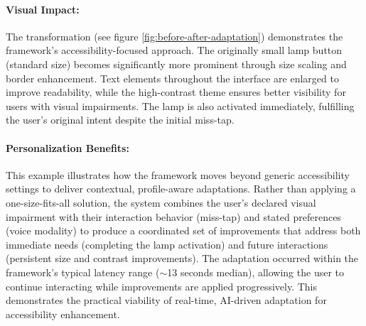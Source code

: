 \documentclass[openany]{book}
\begin{document}
\paragraph{Visual Impact:} 
The transformation (see figure \ref{fig:before-after-adaptation}) demonstrates the framework's accessibility-focused approach. The originally small lamp button (standard size) becomes significantly more prominent through size scaling and border enhancement. Text elements throughout the interface are enlarged to improve readability, while the high-contrast theme ensures better visibility for users with visual impairments. The lamp is also activated immediately, fulfilling the user's original intent despite the initial miss-tap.

\paragraph{Personalization Benefits:} 
This example illustrates how the framework moves beyond generic accessibility settings to deliver contextual, profile-aware adaptations. Rather than applying a one-size-fits-all solution, the system combines the user's declared visual impairment with their interaction behavior (miss-tap) and stated preferences (voice modality) to produce a coordinated set of improvements that address both immediate needs (completing the lamp activation) and future interactions (persistent size and contrast improvements).
The adaptation occurred within the framework's typical latency range ($\sim$13 seconds median), allowing the user to continue interacting while improvements are applied progressively. This demonstrates the practical viability of real-time, AI-driven adaptation for accessibility enhancement.
\end{document}
